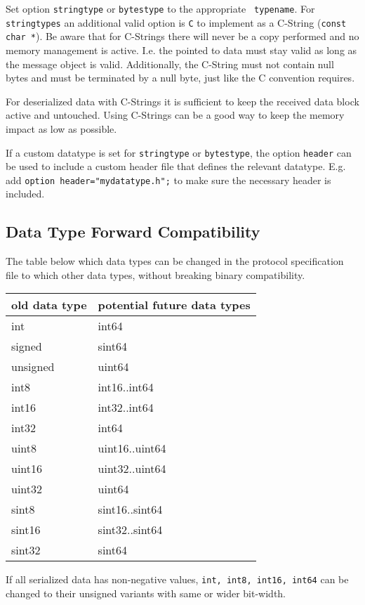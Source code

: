 \documentclass[12pt]{article}
\begin{document}
Set option {\tt stringtype} or {\tt bytestype} to the appropriate {\tt
typename}. For {\tt stringtypes} an additional valid option is {\tt C} to
implement as a C-String ({\tt const char *}). Be aware that for C-Strings there
will never be a copy performed and no memory management is active. I.e. the
pointed to data must stay valid as long as the message object is valid.
Additionally, the C-String must not contain null bytes and must be terminated
by a null byte, just like the C convention requires.

For deserialized data with C-Strings it is sufficient to keep the received data
block active and untouched. Using C-Strings can be a good way to keep the
memory impact as low as possible.

If a custom datatype is set for {\tt stringtype} or {\tt bytestype}, the option
{\tt header} can be used to include a custom header file that defines the
relevant datatype. E.g. add {\tt option header="mydatatype.h";} to make sure
the necessary header is included.

\subsection{Data Type Forward Compatibility}
The table below which data types can be changed in the protocol specification
file to which other data types, without breaking binary compatibility.

\begin{tabular}{|l|l|}
\hline
	old data type & potential future data types\\
\hline
	int	& int64\\
	signed	& sint64\\
	unsigned& uint64\\
	int8	& int16..int64 \\
	int16	& int32..int64 \\
	int32	& int64\\
	uint8	& uint16..uint64\\
	uint16	& uint32..uint64\\
	uint32	& uint64\\
	sint8	& sint16..sint64\\
	sint16	& sint32..sint64\\
	sint32	& sint64\\
\hline
\end{tabular}

If all serialized data has non-negative values, {\tt int, int8, int16, int64}
can be changed to their unsigned variants with same or wider bit-width.
\end{document}
